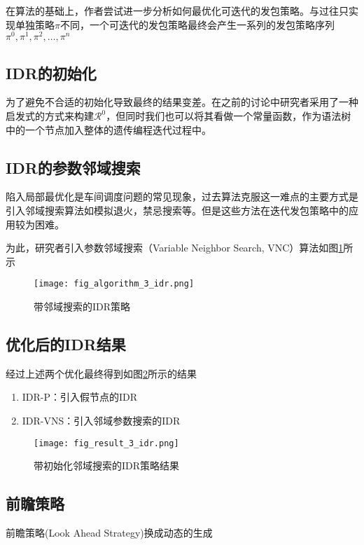 在算法的基础上，作者尝试进一步分析如何最优化可迭代的发包策略。与过往只实现单独策略$\pi$不同，一个可迭代的发包策略最终会产生一系列的发包策略序列 $\pi^0,\pi^1,\pi^2,\dots,\pi^n$

\subsection{IDR的初始化}

为了避免不合适的初始化导致最终的结果变差。在之前的讨论中研究者采用了一种启发式的方式来构建$\mathcal{R}^0$，但同时我们也可以将其看做一个常量函数，作为语法树中的一个节点加入整体的遗传编程迭代过程中。

\subsection{IDR的参数邻域搜索}

陷入局部最优化是车间调度问题的常见现象，过去算法克服这一难点的主要方式是引入邻域搜索算法如模拟退火，禁忌搜索等。但是这些方法在迭代发包策略中的应用较为困难。

为此，研究者引入参数邻域搜索（Variable Neighbor Search, VNC）算法如图\ref{fig:vns_idr}所示

\begin{figure}[H]
    \centering
    \texttt{[image: fig\_algorithm\_3\_idr.png]}
    \caption{带邻域搜索的IDR策略}
    \label{fig:vns_idr}
\end{figure}

\subsection{优化后的IDR结果}

经过上述两个优化最终得到如图\ref{fig:result_enhanced}所示的结果

\begin{enumerate}
    \item IDR-P：引入假节点的IDR
    \item IDR-VNS：引入邻域参数搜索的IDR
\end{enumerate}

\begin{figure}[H]
    \centering
    \texttt{[image: fig\_result\_3\_idr.png]}
    \caption{带初始化邻域搜索的IDR策略结果}
    \label{fig:result_enhanced}
\end{figure}


\subsection{前瞻策略}

前瞻策略(Look Ahead Strategy)换成动态的生成
